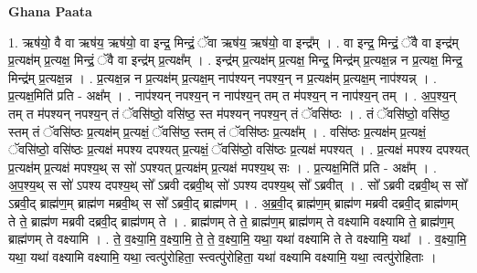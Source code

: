 \documentclass[17pt]{extarticle}
\begin{document}
\textbf{Ghana Paata } \newline

1. ऋष॑यो॒ वै वा ऋष॑य॒ ऋष॑यो॒ वा इन्द्र॒ मिन्द्रं॒ ॅवा ऋष॑य॒ ऋष॑यो॒ वा इन्द्र᳚म् । . वा इन्द्र॒ मिन्द्रं॒ ॅवै वा इन्द्र॑म् प्र॒त्यक्ष॑म् प्र॒त्यक्ष॒ मिन्द्रं॒ ॅवै वा इन्द्र॑म् प्र॒त्यक्ष᳚म् । . इन्द्र॑म् प्र॒त्यक्ष॑म् प्र॒त्यक्ष॒ मिन्द्र॒ मिन्द्र॑म् प्र॒त्यक्ष॒न्न न प्र॒त्यक्ष॒ मिन्द्र॒ मिन्द्र॑म् प्र॒त्यक्ष॒न्न । . प्र॒त्यक्ष॒न्न न प्र॒त्यक्ष॑म् प्र॒त्यक्ष॒म् नाप॑श्यन् नपश्य॒न् न प्र॒त्यक्ष॑म् प्र॒त्यक्ष॒म् नाप॑श्यन्न् । . प्र॒त्यक्ष॒मिति॑ प्रति - अक्ष᳚म् । . नाप॑श्यन् नपश्य॒न् न नाप॑श्य॒न् तम् त म॑पश्य॒न् न नाप॑श्य॒न् तम् । . अ॒प॒श्य॒न् तम् त म॑पश्यन् नपश्य॒न् तं ॅवसि॑ष्ठो॒ वसि॑ष्ठ॒ स्त म॑पश्यन् नपश्य॒न् तं ॅवसि॑ष्ठः । . तं ॅवसि॑ष्ठो॒ वसि॑ष्ठ॒ स्तम् तं ॅवसि॑ष्ठः प्र॒त्यक्ष॑म् प्र॒त्यक्षं॒ ॅवसि॑ष्ठ॒ स्तम् तं ॅवसि॑ष्ठः प्र॒त्यक्ष᳚म् । . वसि॑ष्ठः प्र॒त्यक्ष॑म् प्र॒त्यक्षं॒ ॅवसि॑ष्ठो॒ वसि॑ष्ठः प्र॒त्यक्ष॑ मपश्य दपश्यत् प्र॒त्यक्षं॒ ॅवसि॑ष्ठो॒ वसि॑ष्ठः प्र॒त्यक्ष॑ मपश्यत् । . प्र॒त्यक्ष॑ मपश्य दपश्यत् प्र॒त्यक्ष॑म् प्र॒त्यक्ष॑ मपश्य॒थ् स सो॑ ऽपश्यत् प्र॒त्यक्ष॑म् प्र॒त्यक्ष॑ मपश्य॒थ् सः । . प्र॒त्यक्ष॒मिति॑ प्रति - अक्ष᳚म् । . अ॒प॒श्य॒थ् स सो॑ ऽपश्य दपश्य॒थ् सो᳚ ऽब्रवी दब्रवी॒थ् सो॑ ऽपश्य दपश्य॒थ् सो᳚ ऽब्रवीत् । . सो᳚ ऽब्रवी दब्रवी॒थ् स सो᳚ ऽब्रवी॒द् ब्राह्म॑ण॒म् ब्राह्म॑ण मब्रवी॒थ् स सो᳚ ऽब्रवी॒द् ब्राह्म॑णम् । . अ॒ब्र॒वी॒द् ब्राह्म॑ण॒म् ब्राह्म॑ण मब्रवी दब्रवी॒द् ब्राह्म॑णम् ते ते॒ ब्राह्म॑ण मब्रवी दब्रवी॒द् ब्राह्म॑णम् ते । . ब्राह्म॑णम् ते ते॒ ब्राह्म॑ण॒म् ब्राह्म॑णम् ते वक्ष्यामि वक्ष्यामि ते॒ ब्राह्म॑ण॒म् ब्राह्म॑णम् ते वक्ष्यामि । . ते॒ व॒क्ष्या॒मि॒ व॒क्ष्या॒मि॒ ते॒ ते॒ व॒क्ष्या॒मि॒ यथा॒ यथा॑ वक्ष्यामि ते ते वक्ष्यामि॒ यथा᳚ । . व॒क्ष्या॒मि॒ यथा॒ यथा॑ वक्ष्यामि वक्ष्यामि॒ यथा॒ त्वत्पु॑रोहिता॒ स्त्वत्पु॑रोहिता॒ यथा॑ वक्ष्यामि वक्ष्यामि॒ यथा॒ त्वत्पु॑रोहिताः । \newline
\end{document}
